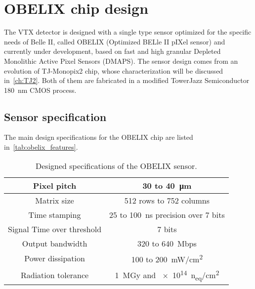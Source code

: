 \clearpage

\section{OBELIX chip design}

The VTX detector is designed with a single type sensor optimized for the specific needs of Belle II, called OBELIX (Optimized BELle II pIXel sensor) and currently under development, based on fast and high granular Depleted Monolithic Active Pixel Sensors (DMAPS). The sensor design comes from an evolution of TJ-Monopix2 chip, whose characterization will be discussed in~\autoref{ch:TJ2}. Both of them are fabricated in a modified TowerJazz Semiconductor \SI{180}{nm} CMOS process.


\subsection{Sensor specification}

The main design specifications for the OBELIX chip are listed in~\autoref{tab:obelix_features}.


\begin{table}[h!]
\centering
\begin{tabular}{c|c}
\hline 
\hline
Pixel pitch & 30 to \SI{40}{\micro m} \\
\hline
Matrix size & 512 rows\numproduct{_x 928} to 752 columns \\
\hline
Time stamping & 25 to \SI{100}{ns} precision over 7 bits\\
\hline
Signal Time over threshold & 7 bits\\
\hline
Output bandwidth & 320 to \SI{640}{Mbps}\\
\hline
Power dissipation & 100 to \SI{200}{mW/cm^{2}}\\
\hline
Radiation tolerance & \SI{1}{MGy} and \SI{e14}{n_{eq}/cm^{2}}\\
\hline
\hline
\end{tabular}
\caption{Designed specifications of the OBELIX sensor.}
\label{tab:obelix_features}
\end{table}

\begin{comment}
\begin{table}[h!]
\centering
\texttt{[image: obelix\_features]}
\caption{Designed specifications of the OBELIX sensor.}
\label{tab:obelix_features}
\end{table}
\end{comment}

